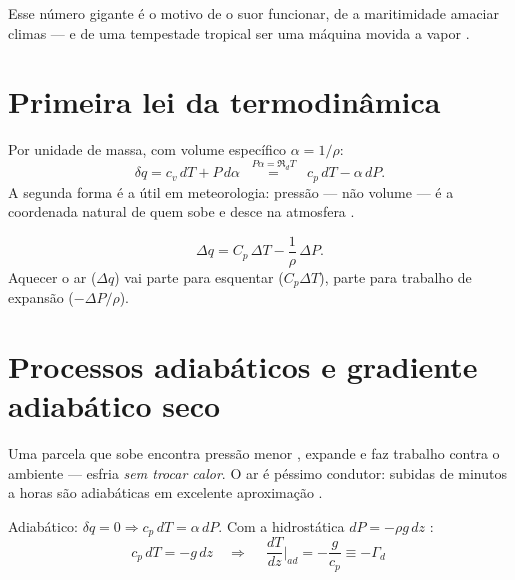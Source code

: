\documentclass[11pt]{article}
\begin{document}
Esse número gigante é o motivo de o suor funcionar, de a maritimidade
amaciar climas — e de uma tempestade tropical ser uma máquina movida a
vapor .

\section{Primeira lei da termodinâmica}\label{sec:primeira}


\begin{formadif}
Por unidade de massa, com volume específico $\alpha = 1/\rho$:
\[ \delta q = c_v\,dT + P\,d\alpha
 \;\;\overset{P\alpha = \Re_d T}{=}\;\; c_p\,dT - \alpha\,dP. \]
A segunda forma é a útil em meteorologia: pressão — não volume — é a
coordenada natural de quem sobe e desce na atmosfera
.
\end{formadif}

\begin{formalivro}[Stull eq.~3.2d]
\[ \Delta q = C_p\,\Delta T - \frac{1}{\rho}\,\Delta P. \]
Aquecer o ar ($\Delta q$) vai parte para esquentar ($C_p\Delta T$), parte
para trabalho de expansão ($-\Delta P/\rho$).
\end{formalivro}

\section{Processos adiabáticos e gradiente adiabático seco}\label{sec:adiab}


Uma parcela que sobe encontra pressão menor , expande e faz trabalho contra o ambiente — esfria \emph{sem
trocar calor}. O ar é péssimo condutor: subidas de minutos a horas são
adiabáticas em excelente aproximação .

\begin{formadif}
Adiabático: $\delta q = 0 \Rightarrow c_p\,dT = \alpha\,dP$. Com a
hidrostática $dP = -\rho g\,dz$ :
\[ c_p\,dT = -g\,dz
\quad\Longrightarrow\quad
\boxed{\ \frac{dT}{dz}\bigg|_{ad} = -\frac{g}{c_p} \equiv -\Gamma_d\ } \]
\end{formadif}
\end{document}
